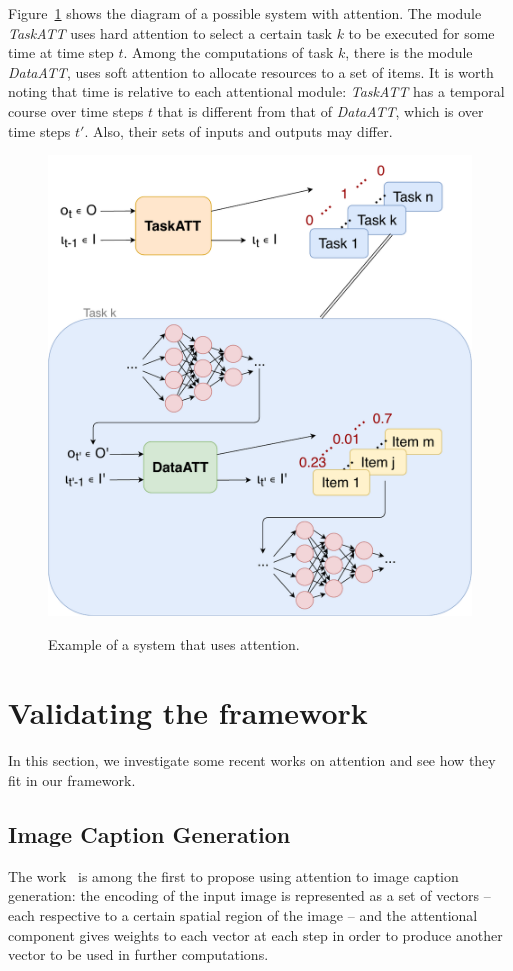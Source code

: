 \documentclass[7pt]{article}
\begin{document}
Figure~\ref{fig:attsystem} shows the diagram of a possible system with attention.
The module \emph{TaskATT} uses hard attention to select a certain task $k$ to be executed for some time at time step $t$.
Among the computations of task $k$, there is the module \emph{DataATT}, uses soft attention to allocate resources to a set of items.
It is worth noting that time is relative to each attentional module: \emph{TaskATT} has a temporal course over time steps $t$ that is different from that of \emph{DataATT}, which is over time steps $t'$.
Also, their sets of inputs and outputs may differ.

\begin{figure}[H]
    \centering
    \includegraphics[width=0.7\linewidth]{./img/att_blocks_example.pdf}
    \label{fig:attsystem}
    \caption{Example of a system that uses attention.}
\end{figure}

\section{Validating the framework}
In this section, we investigate some recent works on attention and see how they fit in our framework.

\subsection{Image Caption Generation}
The work~\cite{ref:show-attend-tell} is among the first to propose using
attention to image caption generation: the encoding of the input image is
represented as a set of vectors -- each respective to a certain spatial region of the image --
and the attentional component gives weights to each vector at each step in order to produce another
vector to be used in further computations.
\end{document}
